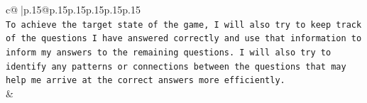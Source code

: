 \documentclass{article}
\begin{document}
{\begin{supertabular}{c@{$\;$}|p{.15\linewidth}@{}p{.15\linewidth}p{.15\linewidth}p{.15\linewidth}p{.15\linewidth}p{.15\linewidth}}
{{{\\ 
\texttt{To achieve the target state of the game, I will also try to keep track of the questions I have answered correctly and use that information to inform my answers to the remaining questions. I will also try to identify any patterns or connections between the questions that may help me arrive at the correct answers more efficiently.} \\
            }
        }
    }
    & \\ \\

\end{supertabular}
}
\end{document}
